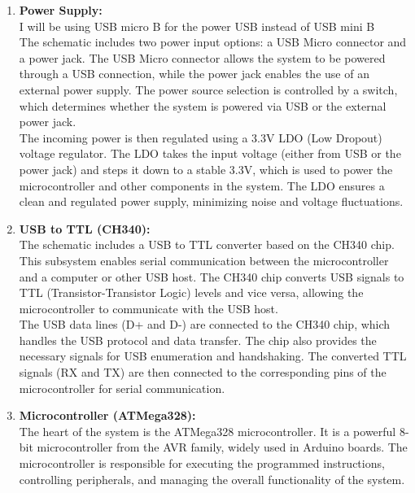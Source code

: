 \documentclass[a4paper,11pt]{article}%
\begin{document}
\begin{enumerate}
	\item \textbf{Power Supply:}\\
	      I will be using USB micro B for the power USB instead of USB mini B\\

	      The schematic includes two power input options: a USB Micro connector and a power jack. The USB Micro connector allows the system to be powered through a USB connection, while the power jack enables the use of an external power supply. The power source selection is controlled by a switch, which determines whether the system is powered via USB or the external power jack.\\

	      The incoming power is then regulated using a 3.3V LDO (Low Dropout) voltage regulator. The LDO takes the input voltage (either from USB or the power jack) and steps it down to a stable 3.3V, which is used to power the microcontroller and other components in the system. The LDO ensures a clean and regulated power supply, minimizing noise and voltage fluctuations.

	\item \textbf{USB to TTL (CH340):}\\The schematic includes a USB to TTL converter based on the CH340 chip. This subsystem enables serial communication between the microcontroller and a computer or other USB host. The CH340 chip converts USB signals to TTL (Transistor-Transistor Logic) levels and vice versa, allowing the microcontroller to communicate with the USB host.\\

	      The USB data lines (D+ and D-) are connected to the CH340 chip, which handles the USB protocol and data transfer. The chip also provides the necessary signals for USB enumeration and handshaking. The converted TTL signals (RX and TX) are then connected to the corresponding pins of the microcontroller for serial communication.
	\item \textbf{Microcontroller (ATMega328):}\\
	      The heart of the system is the ATMega328 microcontroller. It is a powerful 8-bit microcontroller from the AVR family, widely used in Arduino boards. The microcontroller is responsible for executing the programmed instructions, controlling peripherals, and managing the overall functionality of the system.\\


\end{enumerate}
\end{document}
